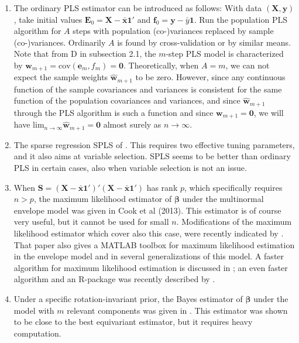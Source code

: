 \documentclass[a4paper, 11pt]{article}
\begin{document}
\begin{enumerate}[label=\alph*.]

\item The ordinary PLS estimator can be introduced as follows: With data $(\bm{X},\bm{y})$, take initial values $\bm{E}_{0}=\bm{X}-\bar{\bm{x}}\bm{1}'$
  and $\bm{f}_{0}=\bm{y}-\bar{y}\bm{1}$. Run the population PLS algorithm for $A$ steps with population (co-)variances replaced by sample (co-)variances.
  Ordinarily $A$ is found by cross-validation or by similar means. Note that from D in subsection 2.1, the $m$-step PLS model is characterized by $\bm{w}_{m+1}=\mathrm{cov}(\bm{e}_m,f_m)=\bm{0}$. Theoretically, when $A=m$, we can not expect the sample weights $\widehat{\bm{w}}_{m+1}$
  to be zero. However, since any continuous function of the sample covariances and variances is consistent for the same function of the
  population covariances and variances, and since  $\widehat{\bm{w}}_{m+1}$ through the PLS algorithm is such a function and since $\bm{w}_{m+1}=\bm{0}$, we will have ${\mathrm{lim}_{n\rightarrow\infty}}\widehat{\bm{w}}_{m+1}=\bm{0}$ almost surely as $n\rightarrow\infty$.
  \smallskip

\item The sparse regression SPLS of \citet{chun2010sparse}. This requires two effective tuning parameters, and it also aims at variable selection. SPLS seems to be better than ordinary PLS in certain cases, also when variable selection is not an issue.
  \smallskip

\item When $\bm{S}=(\bm{X}-\bar{\bm{x}}\bm{1}')'(\bm{X}-\bar{\bm{x}}\bm{1}')$ has rank $p$, which specifically requires $n>p$, the maximum likelihood
  estimator of $\bm{\beta}$ under the multinormal envelope model was given in Cook et al (2013). This estimator is of course very useful, but it cannot be used for small $n$. Modifications of the maximum likelihood estimator which cover also this case, were recently indicated by \citet{cook2015envlp}. That paper also gives a MATLAB toolbox for maximum likelihood estimation in the envelope model and in several generalizations of this model. A faster algorithm for maximum likelihood estimation is discussed in \citet{cook2016algorithms}; an even faster algorithm and an R-package was recently described by \citet{cook2016note}.
  \smallskip

\item Under a specific rotation-invariant prior, the Bayes estimator of $\bm{\beta}$ under the model with $m$ relevant components was given in \citet{helland2012near}. This estimator was shown to be close to the best equivariant estimator, but it requires heavy computation.
  \smallskip

\end{enumerate}
\end{document}
